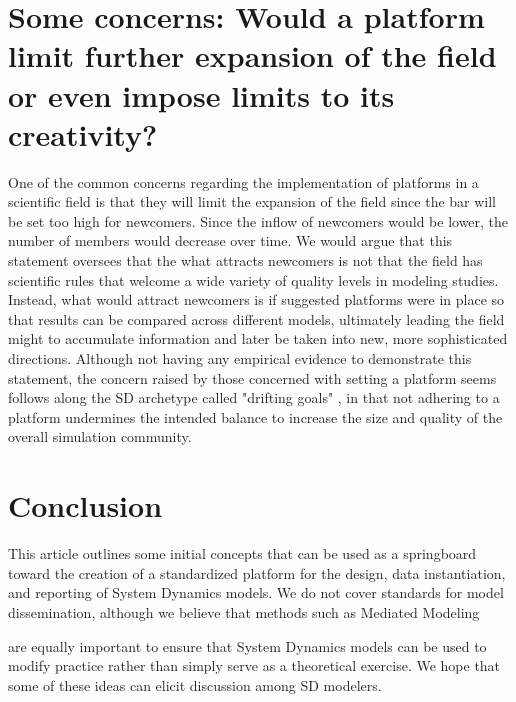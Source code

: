 \documentclass[11pt]{article}
\begin{document}
\section {Some concerns:  Would a platform limit further expansion of the field or even impose limits to its creativity?}
One of the common concerns regarding the implementation of platforms in a scientific field is that they will limit the expansion of the field since the bar will be set too high for newcomers.  Since the inflow of newcomers would be lower, the number of members would decrease over time.  We would argue that this statement oversees that the what attracts newcomers is not that the field has scientific rules that welcome a wide variety of quality levels in modeling studies.  Instead, what would attract newcomers is if suggested platforms were in place so that results can be compared across different models, ultimately leading the field might to accumulate information and later be taken into new, more sophisticated directions.  Although not having any empirical evidence to demonstrate this statement, the concern raised by those concerned with setting a platform seems follows along the SD archetype called "drifting goals" \cite{systems-thinking}, in that not adhering to a platform undermines the intended balance to increase the size and quality of the overall simulation community.


\section {Conclusion}
This article outlines some initial concepts that can be used as a springboard toward the creation of a standardized platform for the design, data instantiation, and reporting of System Dynamics models. We do not cover standards for model dissemination, although we believe that methods such as Mediated Modeling 

are equally important to ensure that System Dynamics models can be used to modify practice rather than simply serve as a theoretical exercise. We hope that some of these ideas can elicit discussion among SD modelers.

\end{document}
